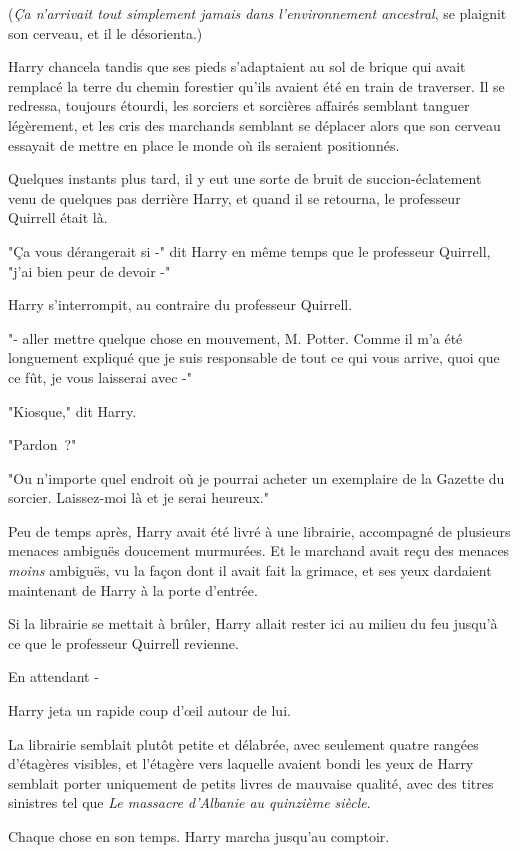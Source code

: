 (\emph{Ça n'arrivait tout simplement jamais dans l'environnement ancestral}, se plaignit son cerveau, et il le désorienta.)

Harry chancela tandis que ses pieds s'adaptaient au sol de brique qui avait remplacé la terre du chemin forestier qu'ils avaient été en train de traverser. Il se redressa, toujours étourdi, les sorciers et sorcières affairés semblant tanguer légèrement, et les cris des marchands semblant se déplacer alors que son cerveau essayait de mettre en place le monde où ils seraient positionnés.

Quelques instants plus tard, il y eut une sorte de bruit de succion-éclatement venu de quelques pas derrière Harry, et quand il se retourna, le professeur Quirrell était là.

"Ça vous dérangerait si -" dit Harry en même temps que le professeur Quirrell, "j'ai bien peur de devoir -"

Harry s'interrompit, au contraire du professeur Quirrell.

"- aller mettre quelque chose en mouvement, M. Potter. Comme il m'a été longuement expliqué que je suis responsable de tout ce qui vous arrive, quoi que ce fût, je vous laisserai avec -"

"Kiosque," dit Harry.

"Pardon~?"

"Ou n'importe quel endroit où je pourrai acheter un exemplaire de la Gazette du sorcier. Laissez-moi là et je serai heureux."

Peu de temps après, Harry avait été livré à une librairie, accompagné de plusieurs menaces ambiguës doucement murmurées. Et le marchand avait reçu des menaces \emph{moins} ambiguës, vu la façon dont il avait fait la grimace, et ses yeux dardaient maintenant de Harry à la porte d'entrée.

Si la librairie se mettait à brûler, Harry allait rester ici au milieu du feu jusqu'à ce que le professeur Quirrell revienne.

En attendant -

Harry jeta un rapide coup d'œil autour de lui.

La librairie semblait plutôt petite et délabrée, avec seulement quatre rangées d'étagères visibles, et l'étagère vers laquelle avaient bondi les yeux de Harry semblait porter uniquement de petits livres de mauvaise qualité, avec des titres sinistres tel que \emph{Le massacre d'Albanie au quinzième siècle}.

Chaque chose en son temps. Harry marcha jusqu'au comptoir.

